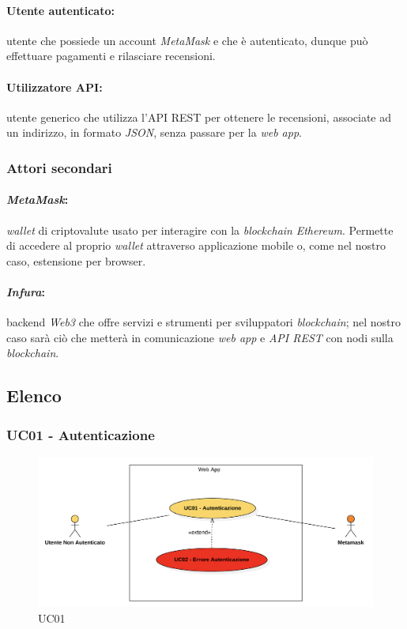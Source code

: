             \paragraph*{Utente autenticato:} utente che possiede un account \textit{MetaMask} e che è autenticato, dunque può effettuare pagamenti e rilasciare recensioni.

            \paragraph*{Utilizzatore API:} utente generico che utilizza l'API REST per ottenere le recensioni, associate ad un indirizzo, in formato \textit{JSON}, senza passare per la \textit{web app}.

        \subsubsection{Attori secondari}
            \paragraph*{\textit{MetaMask}:} \textit{wallet}\glo\: di criptovalute usato per interagire con la \textit{blockchain} \textit{Ethereum}. Permette di accedere al proprio \textit{wallet} attraverso applicazione mobile o, come nel nostro caso, estensione per browser.

            \paragraph*{\textit{Infura}\glo:} backend \textit{Web3}\glo\: che offre servizi e strumenti per sviluppatori \textit{blockchain}; nel nostro caso sarà ciò che metterà in comunicazione \textit{web app} e \textit{API REST} con nodi\glo\: sulla \textit{blockchain}.

    \subsection{Elenco}

        \subsubsection{UC01 - Autenticazione}
        \label{UC01}

            \begin{figure}[H]
                \centering
                \includegraphics[scale=0.6]{src/img/UC01.png}
                \caption{UC01}
            \end{figure}

